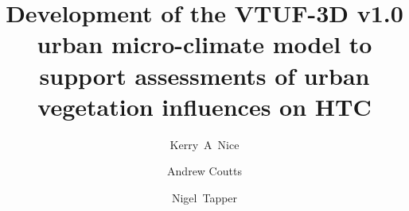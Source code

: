 \documentclass[final,3p,times,authoryear]{elsarticle}
\begin{document}
\begin{frontmatter}



\title{Development of the VTUF-3D v1.0 urban micro-climate model to support assessments of urban vegetation influences on HTC}


\author[monash,crc]{Kerry~A~Nice}
\author[monash,crc]{Andrew Coutts}
\author[monash,crc]{Nigel~Tapper}
\address[monash]{School of Earth, Atmosphere and Environment, Monash University, Clayton, VIC 3800, Australia}
\address[crc]{Cooperative Research Centre for Water Sensitive Cities, Melbourne, Australia}


\begin{abstract}


\end{abstract}
\end{frontmatter}
\end{document}
